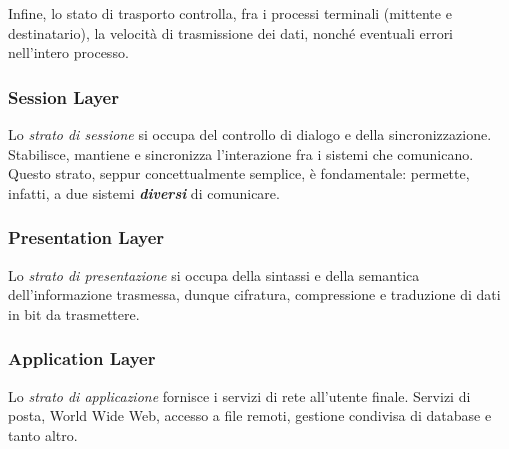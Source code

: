             Infine, lo stato di trasporto controlla, fra i processi terminali (mittente e destinatario), la velocità di trasmissione dei dati, nonché eventuali errori nell'intero processo.
        
        \subsubsection{Session Layer}
        
            Lo \textit{strato di sessione} si occupa del controllo di dialogo e della sincronizzazione. Stabilisce, mantiene e sincronizza l'interazione fra i sistemi che comunicano. Questo strato, seppur concettualmente semplice, è fondamentale: permette, infatti, a due sistemi \textit{\textbf{diversi}} di comunicare.
        
        \subsubsection{Presentation Layer}
        
            Lo \textit{strato di presentazione} si occupa della sintassi e della semantica dell'informazione trasmessa, dunque cifratura, compressione e traduzione di dati in bit da trasmettere.
        
        \subsubsection{Application Layer}
        
            Lo \textit{strato di applicazione} fornisce i servizi di rete all'utente finale. Servizi di posta, World Wide Web, accesso a file remoti, gestione condivisa di database e tanto altro.
